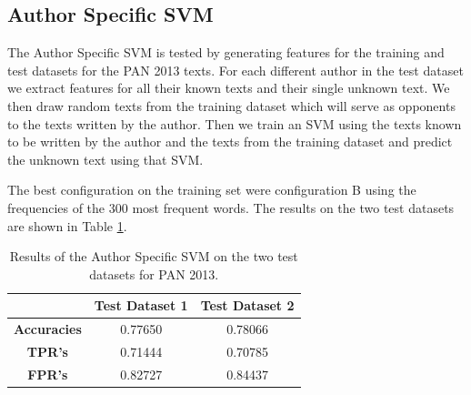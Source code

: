 \subsection{Author Specific SVM}
The Author Specific SVM is tested by generating features for the training and
test datasets for the PAN 2013 texts. For each different author in the test
dataset we extract features for all their known texts and their single unknown
text. We then draw random texts from the training dataset which will serve as
opponents to the texts written by the author. Then we train an SVM using the
texts known to be written by the author and the texts from the training dataset
and predict the unknown text using that SVM.

The best configuration on the training set were configuration B using the
frequencies of the 300 most frequent words. The results on the two test datasets
are shown in Table \ref{table:svm_results}.

\begin{table}
    \centering
    \begin{tabular}{c|cc}
        & \textbf{Test Dataset 1} & \textbf{Test Dataset 2} \\
        \hline
        \textbf{Accuracies} & 0.77650 & 0.78066 \\
        \textbf{\gls{TPR}'s} & 0.71444 & 0.70785 \\
        \textbf{\gls{FPR}'s} & 0.82727 & 0.84437
    \end{tabular}
    \caption{Results of the Author Specific SVM on the two test datasets for PAN
    2013.}
    \label{table:svm_results}
\end{table}
